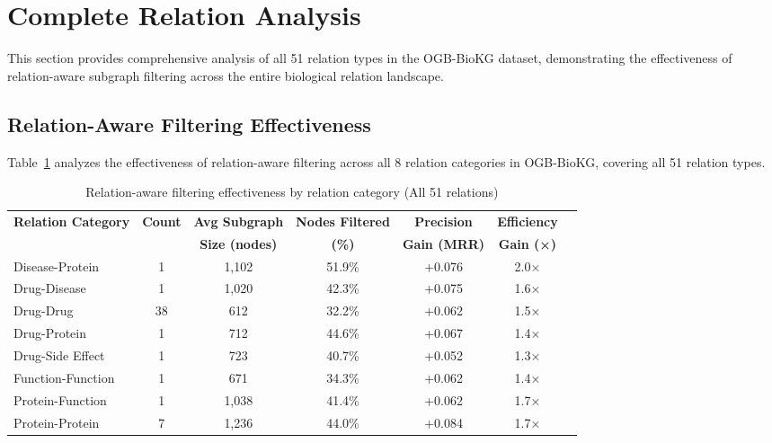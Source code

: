 \appendix

\section{Complete Relation Analysis}
\label{app:complete_relations}

This section provides comprehensive analysis of all 51 relation types in the OGB-BioKG dataset, demonstrating the effectiveness of relation-aware subgraph filtering across the entire biological relation landscape.

\subsection{Relation-Aware Filtering Effectiveness}

Table~\ref{tab:filtering_effectiveness_categories} analyzes the effectiveness of relation-aware filtering across all 8 relation categories in OGB-BioKG, covering all 51 relation types.

\begin{table}[h]
\centering
\caption{Relation-aware filtering effectiveness by relation category (All 51 relations)}
\label{tab:filtering_effectiveness_categories}
\begin{tabular}{lcccccc}
\toprule
\textbf{Relation Category} & \textbf{Count} & \textbf{Avg Subgraph} & \textbf{Nodes Filtered} & \textbf{Precision} & \textbf{Efficiency} \\
& & \textbf{Size (nodes)} & \textbf{(\%)} & \textbf{Gain (MRR)} & \textbf{Gain (×)} \\
\midrule
Disease-Protein & 1 & 1,102 & 51.9\% & +0.076 & 2.0× \\
Drug-Disease & 1 & 1,020 & 42.3\% & +0.075 & 1.6× \\
Drug-Drug & 38 & 612 & 32.2\% & +0.062 & 1.5× \\
Drug-Protein & 1 & 712 & 44.6\% & +0.067 & 1.4× \\
Drug-Side Effect & 1 & 723 & 40.7\% & +0.052 & 1.3× \\
Function-Function & 1 & 671 & 34.3\% & +0.062 & 1.4× \\
Protein-Function & 1 & 1,038 & 41.4\% & +0.062 & 1.7× \\
Protein-Protein & 7 & 1,236 & 44.0\% & +0.084 & 1.7× \\
\bottomrule
\end{tabular}
\end{table}

